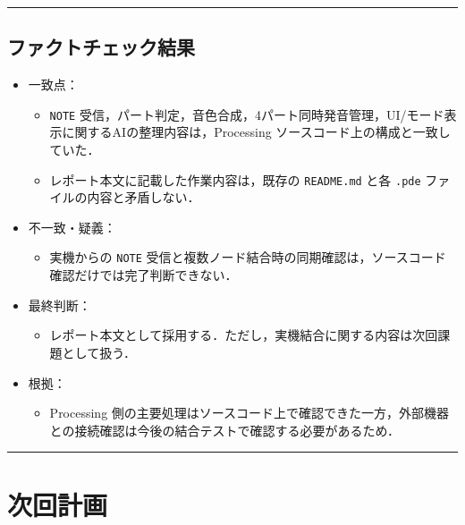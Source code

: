 \documentclass[uplatex,dvipdfmx,a4paper,11pt]{jsarticle}
\newcommand{\sectionrule}{\par\medskip\noindent\rule{\linewidth}{0.6pt}\par\medskip}
\begin{document}
\sectionrule

\subsection{ファクトチェック結果}

\begin{itemize}
  \item 一致点：
    \begin{itemize}
      \item \texttt{NOTE} 受信，パート判定，音色合成，4パート同時発音管理，UI/モード表示に関するAIの整理内容は，Processing ソースコード上の構成と一致していた．
      \item レポート本文に記載した作業内容は，既存の \texttt{README.md} と各 \texttt{.pde} ファイルの内容と矛盾しない．
    \end{itemize}
  \item 不一致・疑義：
    \begin{itemize}
      \item 実機からの \texttt{NOTE} 受信と複数ノード結合時の同期確認は，ソースコード確認だけでは完了判断できない．
    \end{itemize}
  \item 最終判断：
    \begin{itemize}
      \item レポート本文として採用する．ただし，実機結合に関する内容は次回課題として扱う．
    \end{itemize}
  \item 根拠：
    \begin{itemize}
      \item Processing 側の主要処理はソースコード上で確認できた一方，外部機器との接続確認は今後の結合テストで確認する必要があるため．
    \end{itemize}
\end{itemize}

\sectionrule

\section{次回計画}
\end{document}
